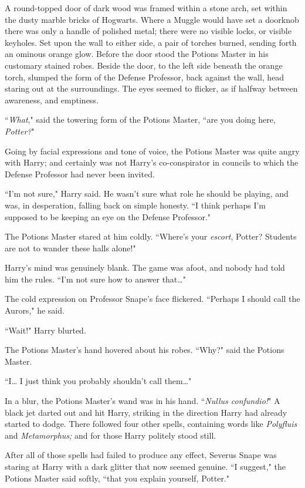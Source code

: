 A round-topped door of dark wood was framed within a stone arch, set within the dusty marble bricks of Hogwarts. Where a Muggle would have set a doorknob there was only a handle of polished metal; there were no visible locks, or visible keyholes. Set upon the wall to either side, a pair of torches burned, sending forth an ominous orange glow. Before the door stood the Potions Master in his customary stained robes. Beside the door, to the left side beneath the orange torch, slumped the form of the Defense Professor, back against the wall, head staring out at the surroundings. The eyes seemed to flicker, as if halfway between awareness, and emptiness.

``\emph{What}," said the towering form of the Potions Master, ``are you doing here, \emph{Potter?}"

Going by facial expressions and tone of voice, the Potions Master was quite angry with Harry; and certainly was not Harry's co-conspirator in councils to which the Defense Professor had never been invited.

``I'm not sure," Harry said. He wasn't sure what role he should be playing, and was, in desperation, falling back on simple honesty. ``I think perhaps I'm supposed to be keeping an eye on the Defense Professor."

The Potions Master stared at him coldly. ``Where's your \emph{escort}, Potter? Students are not to wander these halls alone!"

Harry's mind was genuinely blank. The game was afoot, and nobody had told him the rules. ``I'm not sure how to answer that{\ldots}"

The cold expression on Professor Snape's face flickered. ``Perhaps I should call the Aurors," he said.

``Wait!" Harry blurted.

The Potions Master's hand hovered about his robes. ``Why?" said the Potions Master.

``I{\ldots} I just think you probably shouldn't call them{\ldots}"

In a blur, the Potions Master's wand was in his hand. ``\emph{Nullus confundio!}" A black jet darted out and hit Harry, striking in the direction Harry had already started to dodge. There followed four other spells, containing words like \emph{Polyfluis} and \emph{Metamorphus;} and for those Harry politely stood still.

After all of those spells had failed to produce any effect, Severus Snape was staring at Harry with a dark glitter that now seemed genuine. ``I suggest," the Potions Master said softly, ``that you explain yourself, Potter."

